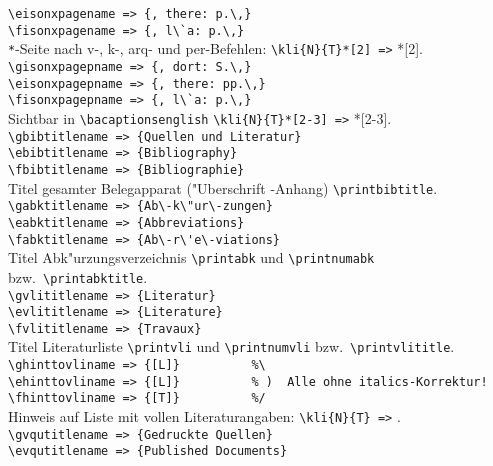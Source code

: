 \documentclass[12pt,a4paper]{article}
\begin{document}
{\verb|\eisonxpagename => {, there: p.\,}| \\[-.8ex]
\verb|\fisonxpagename => {, l\`a: p.\,}| \\[-.2ex]
\verb|*|-Seite nach v-, k-, arq- und per-Befehlen: \verb|\kli{N}{T}*[2] =>| *[2].
\\[.8ex]%
\verb|\gisonxpagepname => {, dort: S.\,}| \\[-.8ex]
\verb|\eisonxpagepname => {, there: pp.\,}| \\[-.8ex]
\verb|\fisonxpagepname => {, l\`a: p.\,}| \\[-.2ex]
Sichtbar in {\bacaptionsenglish\verb|\bacaptionsenglish| \verb|\kli{N}{T}*[2-3] =>| *[2-3].}
\\[.8ex]%
\verb|\gbibtitlename => {Quellen und Literatur}| \\[-.8ex]
\verb|\ebibtitlename => {Bibliography}| \\[-.8ex]
\verb|\fbibtitlename => {Bibliographie}| \\[-.2ex]
Titel gesamter Belegapparat ("Uberschrift \BibArts-Anhang) \verb|\printbibtitle|.
\\[.8ex]%
\verb|\gabktitlename => {Ab\-k\"ur\-zungen}| \\[-.8ex]
\verb|\eabktitlename => {Abbreviations}| \\[-.8ex]
\verb|\fabktitlename => {Ab\-r\'e\-viations}| \\[-.2ex]
Titel Abk"urzungsverzeichnis \verb|\printabk| und \verb|\printnumabk| bzw.\ \verb|\printabktitle|.
\\[.8ex]%
\verb|\gvlititlename => {Literatur}| \\[-.8ex]
\verb|\evlititlename => {Literature}| \\[-.8ex]
\verb|\fvlititlename => {Travaux}| \\[-.2ex]
Titel Literaturliste \verb|\printvli| und \verb|\printnumvli| bzw.\ \verb|\printvlititle|.
\\[.8ex]%
\verb|\ghinttovliname => {[L]}          %\| \\[-.8ex]
\verb|\ehinttovliname => {[L]}          % )  Alle ohne italics-Korrektur!| \\[-.8ex]
\verb|\fhinttovliname => {[T]}          %/| \\[-.2ex]
Hinweis auf Liste mit vollen Literaturangaben: \verb|\kli{N}{T} =>| .
\\[.8ex]%
\verb|\gvqutitlename => {Gedruckte Quellen}| \\[-.8ex]
\verb|\evqutitlename => {Published Documents}| \\[-.8ex]
}
\end{document}
